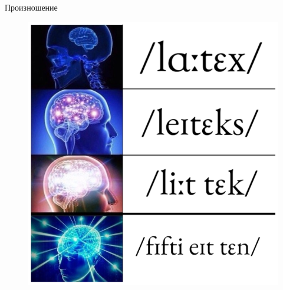 \documentclass[10pt,aspectratio=169]{beamer}
\begin{document}
    \begin{frame}{Произношение}
    	\begin{figure}[h!]
    		\centering
    		\includegraphics[scale=0.25]{img/megabrain.png}
    		\label{fig:megabrain}
		\end{figure}
   	\end{frame}
    
\end{document}
